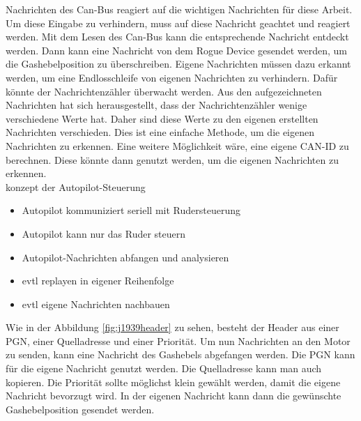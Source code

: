 Nachrichten des Can-Bus reagiert auf die wichtigen Nachrichten für diese Arbeit.
Um diese Eingabe zu verhindern, muss auf diese Nachricht geachtet und reagiert werden. Mit dem Lesen des Can-Bus kann die 
entsprechende Nachricht entdeckt werden. Dann kann eine Nachricht von dem Rogue Device gesendet werden, um die Gashebelposition
zu überschreiben. Eigene Nachrichten müssen dazu erkannt werden, um eine Endlosschleife von eigenen Nachrichten zu verhindern. Dafür könnte
der Nachrichtenzähler überwacht werden. Aus den aufgezeichneten Nachrichten hat sich herausgestellt, dass der 
Nachrichtenzähler wenige verschiedene Werte hat. Daher sind diese Werte zu den eigenen erstellten Nachrichten 
verschieden. Dies ist eine einfache Methode, um die eigenen Nachrichten zu erkennen. Eine weitere Möglichkeit wäre,
eine eigene CAN-ID zu berechnen. Diese könnte dann genutzt werden, um die eigenen Nachrichten zu erkennen.
\\
konzept der Autopilot-Steuerung
\begin{itemize}
    \item Autopilot kommuniziert seriell mit Rudersteuerung
    \item Autopilot kann nur das Ruder steuern
    \item Autopilot-Nachrichten abfangen und analysieren
    \item evtl replayen in eigener Reihenfolge
    \item evtl eigene Nachrichten nachbauen
\end{itemize}


Wie in der Abbildung \ref{fig:j1939header} zu sehen, besteht der Header aus einer PGN, einer Quelladresse und einer Priorität. Um nun Nachrichten
an den Motor zu senden, kann eine Nachricht des Gashebels abgefangen werden. Die PGN kann für die eigene Nachricht genutzt
werden. Die Quelladresse kann man auch kopieren. Die Priorität sollte möglichst klein gewählt werden, 
damit die eigene Nachricht bevorzugt wird. In der eigenen Nachricht kann dann die gewünschte Gashebelposition gesendet werden.

